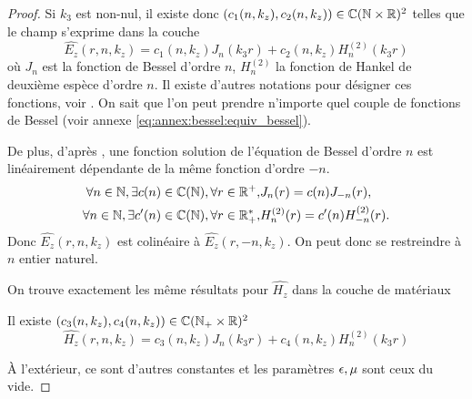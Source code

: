 \begin{proof}
    Si \(k_3\) est non-nul, il existe donc \((c_1(n,k_z),c_2(n,k_z)) \in \mathbb C(\mathbb N\times\mathbb R)^2\) telles que le champ s'exprime dans la couche
    \begin{equation*}
          \hat{E_z}(r,n,k_z) = c_1(n,k_z) J_n\left(k_3r\right) + c_2(n,k_z) H_n^{(2)}\left(k_3r\right)
    \end{equation*}
    où \(J_n\) est la fonction de Bessel d'ordre \(n\), \(H_n^{(2)}\) la fonction de Hankel de deuxième espèce d'ordre \(n\). Il existe d'autres notations pour désigner ces fonctions,  voir \cite[p.~358]{abramowitz_handbook_1964}.
    On sait que l'on peut prendre n'importe quel couple de fonctions de Bessel (voir annexe \eqref{eq:annex:bessel:equiv_bessel}).

    De plus, d'après \cite[p.~358]{abramowitz_handbook_1964}, une fonction solution de l'équation de Bessel d'ordre \(n\) est linéairement dépendante de la même fonction d'ordre \(-n\).
    \begin{align*}
       \forall n \in \mathbb N, \exists c(n) \in \mathbb C(\mathbb N), \forall r \in \mathbb R^+,& J_n(r) = c(n)J_{-n}(r),
       \\
       \forall n \in \mathbb N, \exists c'(n) \in \mathbb C(\mathbb N), \forall r \in \mathbb R_+^*,& H_n^{(2)}(r) = c'(n)H_{-n}^{(2)}(r).
    \end{align*}
    Donc  \(\hat{E_z}(r,n,k_z)\) est colinéaire à  \(\hat{E_z}(r,-n,k_z)\).
    On peut donc se restreindre à \(n\) entier naturel.

    On trouve exactement les même résultats pour \(\hat{H_z}\) dans la couche de matériaux

    Il existe \((c_3(n,k_z),c_4(n,k_z)) \in \mathbb C(\mathbb N_+\times\mathbb R)^2\)
    \begin{equation*}
      \hat{H_z}(r,n,k_z) = c_3(n,k_z) J_n\left(k_3r\right) + c_4(n,k_z) H_n^{(2)}\left(k_3r\right)
    \end{equation*}

    À l'extérieur, ce sont d'autres constantes et les paramètres \(\epsilon,\mu\) sont ceux du vide. 
  \end{proof}

